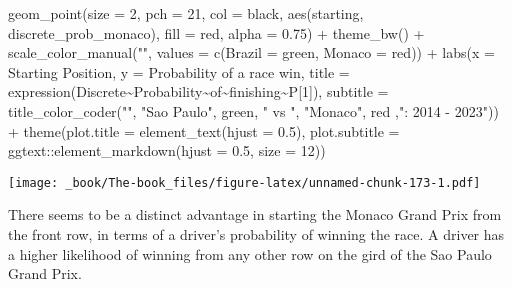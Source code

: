 \documentclass[
]{book}
\newenvironment{Shaded}{\begin{snugshade}}{\end{snugshade}}
\newcommand{\AttributeTok}[1]{\textcolor[rgb]{0.77,0.63,0.00}{#1}}
\newcommand{\DecValTok}[1]{\textcolor[rgb]{0.00,0.00,0.81}{#1}}
\newcommand{\FloatTok}[1]{\textcolor[rgb]{0.00,0.00,0.81}{#1}}
\newcommand{\FunctionTok}[1]{\textcolor[rgb]{0.00,0.00,0.00}{#1}}
\newcommand{\NormalTok}[1]{#1}
\newcommand{\OtherTok}[1]{\textcolor[rgb]{0.56,0.35,0.01}{#1}}
\newcommand{\SpecialCharTok}[1]{\textcolor[rgb]{0.00,0.00,0.00}{#1}}
\newcommand{\StringTok}[1]{\textcolor[rgb]{0.31,0.60,0.02}{#1}}
\begin{document}
\begin{Shaded}
\begin{Highlighting}[]
  \FunctionTok{geom\_point}\NormalTok{(}\AttributeTok{size =} \DecValTok{2}\NormalTok{, }\AttributeTok{pch =} \DecValTok{21}\NormalTok{, }\AttributeTok{col =} \StringTok{\textquotesingle{}black\textquotesingle{}}\NormalTok{, }\FunctionTok{aes}\NormalTok{(starting, discrete\_prob\_monaco), }\AttributeTok{fill =} \StringTok{\textquotesingle{}red\textquotesingle{}}\NormalTok{, }\AttributeTok{alpha =} \FloatTok{0.75}\NormalTok{) }\SpecialCharTok{+}
  \FunctionTok{theme\_bw}\NormalTok{() }\SpecialCharTok{+}
  \FunctionTok{scale\_color\_manual}\NormalTok{(}\StringTok{""}\NormalTok{, }\AttributeTok{values =} \FunctionTok{c}\NormalTok{(}\StringTok{\textquotesingle{}Brazil\textquotesingle{}} \OtherTok{=} \StringTok{\textquotesingle{}green\textquotesingle{}}\NormalTok{, }\StringTok{\textquotesingle{}Monaco\textquotesingle{}} \OtherTok{=} \StringTok{\textquotesingle{}red\textquotesingle{}}\NormalTok{)) }\SpecialCharTok{+}
  \FunctionTok{labs}\NormalTok{(}\AttributeTok{x =} \StringTok{\textquotesingle{}Starting Position\textquotesingle{}}\NormalTok{,}
       \AttributeTok{y =} \StringTok{\textquotesingle{}Probability of a race win\textquotesingle{}}\NormalTok{,}
       \AttributeTok{title =} \FunctionTok{expression}\NormalTok{(Discrete}\SpecialCharTok{\textasciitilde{}}\NormalTok{Probability}\SpecialCharTok{\textasciitilde{}}\NormalTok{of}\SpecialCharTok{\textasciitilde{}}\NormalTok{finishing}\SpecialCharTok{\textasciitilde{}}\NormalTok{P[}\DecValTok{1}\NormalTok{]),}
       \AttributeTok{subtitle =} \FunctionTok{title\_color\_coder}\NormalTok{(}\StringTok{""}\NormalTok{, }\StringTok{"Sao Paulo"}\NormalTok{, }\StringTok{\textquotesingle{}green\textquotesingle{}}\NormalTok{, }\StringTok{" vs "}\NormalTok{, }\StringTok{"Monaco"}\NormalTok{, }\StringTok{\textquotesingle{}red\textquotesingle{}}\NormalTok{ ,}\StringTok{": 2014 {-} 2023"}\NormalTok{)) }\SpecialCharTok{+}
  \FunctionTok{theme}\NormalTok{(}\AttributeTok{plot.title =} \FunctionTok{element\_text}\NormalTok{(}\AttributeTok{hjust =} \FloatTok{0.5}\NormalTok{),}
        \AttributeTok{plot.subtitle =}\NormalTok{ ggtext}\SpecialCharTok{::}\FunctionTok{element\_markdown}\NormalTok{(}\AttributeTok{hjust =} \FloatTok{0.5}\NormalTok{, }\AttributeTok{size =} \DecValTok{12}\NormalTok{)) }
\end{Highlighting}
\end{Shaded}

\texttt{[image: \_book/The-book\_files/figure-latex/unnamed-chunk-173-1.pdf]}

There seems to be a distinct advantage in starting the Monaco Grand Prix from the front row, in terms of a driver's probability of winning the race. A driver has a higher likelihood of winning from any other row on the gird of the Sao Paulo Grand Prix.
\end{document}
